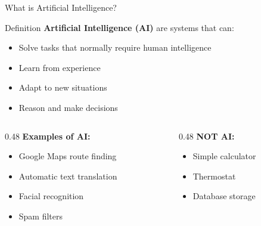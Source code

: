 \documentclass[aspectratio=169, 10pt]{beamer}
\begin{document}
\begin{frame}{What is Artificial Intelligence?}

    \begin{block}{\footnotesize Definition}
        \footnotesize
        \textbf{Artificial Intelligence (AI)} are systems that can:
        \begin{itemize}
            \item Solve tasks that normally require human intelligence
            \item Learn from experience
            \item Adapt to new situations
            \item Reason and make decisions
        \end{itemize}
    \end{block}

    \vspace{2mm}
    \begin{columns}
        \begin{column}{0.48\textwidth}
            \textbf{Examples of AI:}
            \begin{itemize}
                \item Google Maps route finding
                \item Automatic text translation
                \item Facial recognition
                \item Spam filters
            \end{itemize}
        \end{column}
        \begin{column}{0.48\textwidth}
            \textbf{NOT AI:}
            \begin{itemize}
                \item Simple calculator
                \item Thermostat
                \item Database storage
            \end{itemize}
        \end{column}
    \end{columns}

\end{frame}
\end{document}
